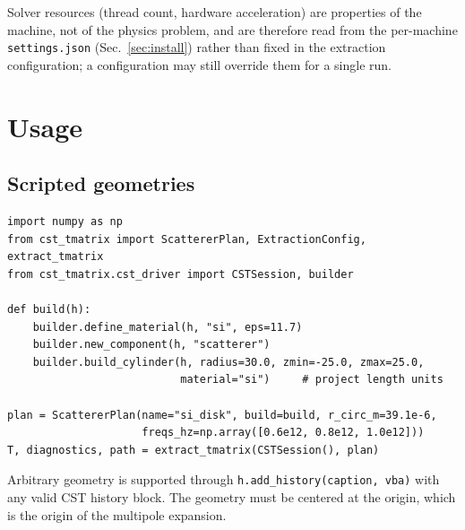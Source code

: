 \documentclass[11pt]{article}
\begin{document}
Solver resources (thread count, hardware acceleration) are properties
of the machine, not of the physics problem, and are therefore read
from the per-machine \texttt{settings.json} (Sec.~\ref{sec:install})
rather than fixed in the extraction configuration; a configuration may
still override them for a single run.

\section{Usage}
\label{sec:usage}

\subsection{Scripted geometries}
\begin{verbatim}
import numpy as np
from cst_tmatrix import ScattererPlan, ExtractionConfig, extract_tmatrix
from cst_tmatrix.cst_driver import CSTSession, builder

def build(h):
    builder.define_material(h, "si", eps=11.7)
    builder.new_component(h, "scatterer")
    builder.build_cylinder(h, radius=30.0, zmin=-25.0, zmax=25.0,
                           material="si")     # project length units

plan = ScattererPlan(name="si_disk", build=build, r_circ_m=39.1e-6,
                     freqs_hz=np.array([0.6e12, 0.8e12, 1.0e12]))
T, diagnostics, path = extract_tmatrix(CSTSession(), plan)
\end{verbatim}
Arbitrary geometry is supported through
\texttt{h.add\_history(caption, vba)} with any valid CST history block.
The geometry must be centered at the origin, which is the origin of the
multipole expansion.
\end{document}
